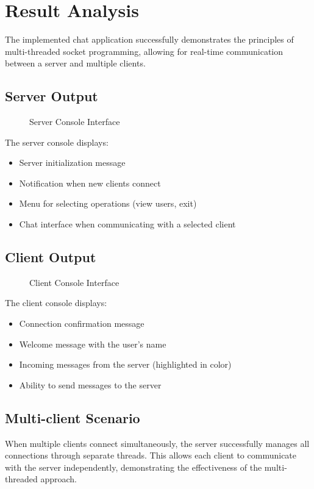 \documentclass[12pt,a4paper]{article}
\begin{document}
\section{Result Analysis}
The implemented chat application successfully demonstrates the principles of multi-threaded socket programming, allowing for real-time communication between a server and multiple clients.

\subsection{Server Output}
\begin{figure}[H]
    \centering
    \caption{Server Console Interface}
    \label{fig:server_output}
\end{figure}

The server console displays:
\begin{itemize}
    \item Server initialization message
    \item Notification when new clients connect
    \item Menu for selecting operations (view users, exit)
    \item Chat interface when communicating with a selected client
\end{itemize}

\subsection{Client Output}
\begin{figure}[H]
    \centering
    \caption{Client Console Interface}
    \label{fig:client_output}
\end{figure}

The client console displays:
\begin{itemize}
    \item Connection confirmation message
    \item Welcome message with the user's name
    \item Incoming messages from the server (highlighted in color)
    \item Ability to send messages to the server
\end{itemize}

\subsection{Multi-client Scenario}
When multiple clients connect simultaneously, the server successfully manages all connections through separate threads. This allows each client to communicate with the server independently, demonstrating the effectiveness of the multi-threaded approach.
\end{document}
